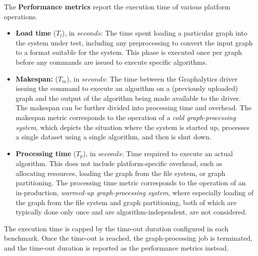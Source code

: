 The {\bf Performance metrics} report the execution time of various platform operations.

\begin{itemize}
	\item {\bf Load time} ($T_l$), in $seconds$:  The time spent loading a particular graph into the system under test, including any preprocessing to convert the input graph to a format suitable for the system. This phase is executed once per graph before any commands are issued to execute specific algorithms.
	\item {\bf Makespan:} ($T_m$), in $seconds$: The time between the Graphalytics driver issuing the command to execute an algorithm on a (previously uploaded) graph and the output of the algorithm being made available to the driver. The makespan can be further divided into processing time and overhead. The makespan metric corresponds to the operation of a {\it cold graph-processing system}, which depicts the situation where the system is started up, processes a single dataset using a single algorithm, and then is shut down.
	\item {\bf Processing time} ($T_p$), in $seconds$: Time required to execute an actual algorithm. This does not include platform-specific overhead, such as allocating resources, loading the graph from the file system, or graph partitioning. The processing time metric corresponds to the operation of an in-production, {\it warmed-up graph-processing system}, where especially loading of the graph from the file system and graph partitioning, both of which are typically done only once and are algorithm-independent, are not considered.
\end{itemize}

The execution time is capped by the time-out duration configured in each benchmark. Once the time-out is reached, the graph-processing job is terminated, and the time-out duration is reported as the performance metrics instead.

